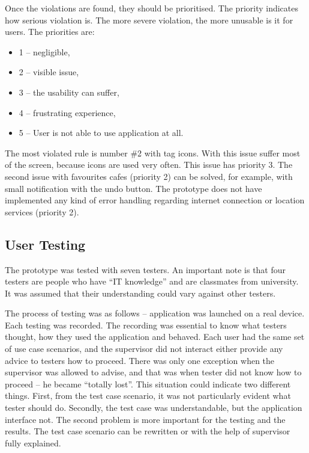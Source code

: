 Once the violations are found, they should be prioritised. The priority indicates how serious violation is. The more severe violation, the more unusable is it for users. The priorities are: 

\begin{itemize}
    \item 1 -- negligible,
    \item 2 -- visible issue,
    \item 3 -- the usability can suffer,
    \item 4 -- frustrating experience,
    \item 5 -- User is not able to use application at all.
\end{itemize}

The most violated rule is number \#2 with tag icons. With this issue suffer most of the screen, because icons are used very often.  This issue has priority 3.  The second issue with favourites cafes (priority 2) can be solved, for example, with small notification with the undo button. The prototype does not have implemented any kind of error handling regarding internet connection or location services (priority 2). 
\subsection{User Testing}
The prototype was tested with seven testers. An important note is that four testers are people who have ``IT knowledge'' and are classmates from university. It was assumed that their understanding could vary against other testers.

The process of testing was as follows -- application was launched on a real device. Each testing was recorded. The recording was essential to know what testers thought, how they used the application and behaved. Each user had the same set of use case scenarios, and the supervisor did not interact either provide any advice to testers how to proceed. There was only one exception when the supervisor was allowed to advise, and that was when tester did not know how to proceed -- he became ``totally lost''. This situation could indicate two different things. First, from the test case scenario, it was not particularly evident what tester should do. Secondly, the test case was understandable, but the application interface not. The second problem is more important for the testing and the results.  The test case scenario can be rewritten or with the help of supervisor fully explained. 

